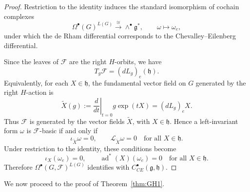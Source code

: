 \documentclass[reqno, 11pt]{amsart}
\theoremstyle{definition}
\theoremstyle{property}
\theoremstyle{remark}
\numberwithin{equation}{section}
\begin{document}
\begin{proof}
Restriction to the identity induces the standard isomorphism of cochain complexes
\[
\Omega^\bullet(G)^{L(G)} \xrightarrow{\;\cong\;} \wedge^\bullet\mathfrak g^*,
\qquad \omega \mapsto \omega_e,
\]
under which the de Rham differential corresponds to the Chevalley--Eilenberg differential.

Since the leaves of $\mathcal{F}$ are the right $H$-orbits, we have
\[
T_g\mathcal F=(dL_g)_e(\mathfrak h).
\]
Equivalently, for each $X\in\mathfrak h$, the fundamental vector field on $G$
generated by the right $H$-action is
\[
\widetilde X(g):=\left.\frac{d}{dt}\right|_{t=0} g\exp(tX)=(dL_g)_eX.
\]
Thus $\mathcal{F}$ is generated by the vector fields $\widetilde X$, with $X\in\mathfrak h$.
Hence a left-invariant form $\omega$ is $\mathcal{F}$-basic if and only if
\[
\iota_{\widetilde X}\omega=0,\qquad \mathcal L_{\widetilde X}\omega=0
\quad\text{for all }X\in\mathfrak h.
\]
Under restriction to the identity, these conditions become
\[
\iota_X(\omega_e)=0,\qquad \operatorname{ad}^*(X)(\omega_e)=0
\quad\text{for all }X\in\mathfrak h.
\]
Therefore $\Omega^\bullet(G,\mathcal F)^{L(G)}$ identifies with
$C^\bullet_{CE}(\mathfrak g,\mathfrak h)$.
\end{proof}


We now proceed to the proof of Theorem~\ref{thm:GH1}.
\end{document}
